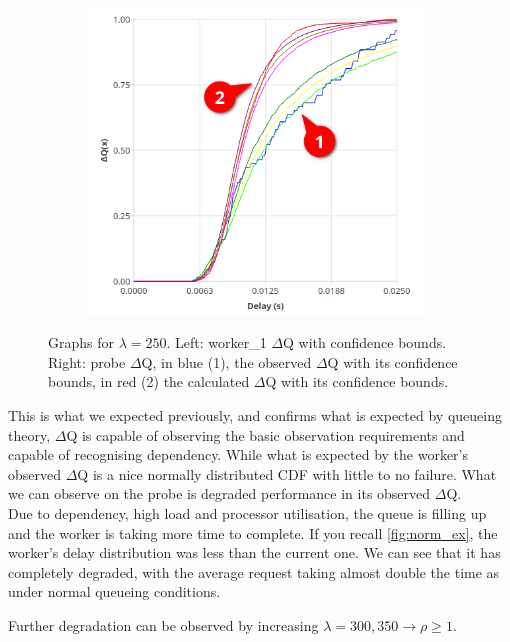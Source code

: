 \begin{figure}[H]
\begin{subfigure}{.5\textwidth}
                \includegraphics[width =0.98\textwidth]{img/overload_2/250_probe2.png}
                \label{fig:high_load_2}
            \end{subfigure}
            \label{fig:early_ov}
            \caption{Graphs for $\lambda = 250$. Left: worker\_1 $\Delta$Q with confidence bounds. \\
            Right: probe $\Delta$Q, in blue (1), the observed $\Delta$Q with its confidence bounds, in red (2) the calculated $\Delta$Q with its confidence bounds.}
        \end{figure}
    
    This is what we expected previously, and confirms what is expected by queueing theory, $\Delta$Q is capable of observing the basic observation requirements and capable of recognising dependency. While what is expected by the worker's observed $\Delta$Q is a nice normally distributed CDF with little to no failure. What we can observe on the probe is degraded performance in its observed $\Delta$Q. \\
    Due to dependency, high load and processor utilisation, the queue is filling up and the worker is taking more time to complete. If you recall \cref{fig:norm_ex}, the worker's delay distribution was less than the current one. We can see that it has completely degraded, with the average request taking almost double the time as under normal queueing conditions. 

    Further degradation can be observed by increasing $\lambda = {300, 350} \rightarrow \rho \ge 1$.

